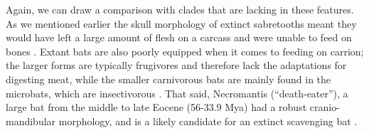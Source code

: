 \documentclass[a4paper,12pt]{article}
\begin{document}
Again, we can draw a comparison with clades that are lacking in these features. 
As we mentioned earlier the skull morphology of extinct sabretooths meant they would have left a large amount of flesh on a carcass and were unable to feed on bones \citep{palmqvist2011giant}. 
Extant bats are also poorly equipped when it comes to feeding on carrion; the larger forms are typically frugivores and therefore lack the adaptations for digesting meat, while the smaller carnivorous bats are mainly found in the microbats, which are insectivorous \citep{aguirre2003implications}.   
That said, Necromantis (“death-eater”), a large bat from the middle to late Eocene (56-33.9 Mya) had a robust cranio-mandibular morphology, and is a likely candidate for an extinct scavenging bat \citep{Weithofer_Necromantis_1887,Hand_Necromantis_2012}.




















\end{document}
